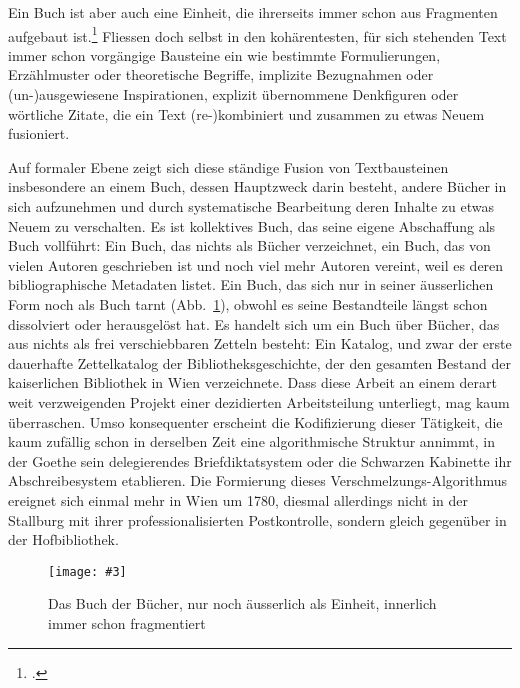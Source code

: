 \documentclass[a4paper,11pt]{article}
\newcommand{\pngbild}[4]{\texttt{[image: \#3]}}
\begin{document}
Ein Buch ist aber auch eine Einheit, die ihrerseits immer schon aus Fragmenten aufgebaut ist.\footcite[Zur Übersicht einer historischen Genese des Fragments als ästhetische Produktivkraft vgl.][]{fetscher:2001} Fliessen doch selbst in den kohärentesten, für sich stehenden Text immer schon vorgängige Bausteine ein wie bestimmte Formulierungen, Erzählmuster oder theoretische Begriffe, implizite Bezugnahmen oder (un-)ausgewiesene Inspirationen, explizit übernommene Denkfiguren oder wörtliche Zitate, die ein Text (re-)kombiniert und zusammen zu etwas Neuem fusioniert. 
 
Auf formaler Ebene zeigt sich diese ständige Fusion von Textbausteinen insbesondere an einem Buch, dessen Hauptzweck darin besteht, andere Bücher in sich aufzunehmen und durch systematische Bearbeitung deren Inhalte zu etwas Neuem zu verschalten. Es ist kollektives Buch, das seine eigene Abschaffung als Buch vollführt: Ein Buch, das nichts als Bücher verzeichnet, ein Buch, das von vielen Autoren geschrieben ist und noch viel mehr Autoren vereint, weil es deren bibliographische Metadaten listet. Ein Buch, das sich nur in seiner äusserlichen Form noch als Buch tarnt (Abb.~\ref{abb:kapsel}), obwohl es seine Bestandteile längst schon dissolviert oder herausgelöst hat. Es handelt sich um ein Buch über Bücher, das aus nichts als frei verschiebbaren Zetteln besteht: Ein Katalog, und zwar der erste dauerhafte Zettelkatalog der Bibliotheksgeschichte, der den gesamten Bestand der kaiserlichen Bibliothek in Wien verzeichnete. Dass diese Arbeit an einem derart weit verzweigenden Projekt einer dezidierten Arbeitsteilung unterliegt, mag kaum überraschen. Umso konsequenter erscheint die Kodifizierung dieser Tätigkeit, die kaum zufällig schon in derselben Zeit eine algorithmische Struktur annimmt, in der Goethe sein delegierendes Briefdiktatsystem oder die Schwarzen Kabinette ihr Abschreibesystem etablieren. Die Formierung dieses Verschmelzungs-Algorithmus ereignet sich einmal mehr in Wien um 1780, diesmal allerdings nicht in der Stallburg mit ihrer professionalisierten Postkontrolle, sondern gleich gegenüber in der Hofbibliothek.

\begin{figure}[ht]
\begin{center}
\pngbild{1335}{982}{../bilder/Kapsel.png}{0.8\textwidth}\\[-3mm]
\caption{Das Buch der Bücher, nur noch äusserlich als Einheit, innerlich immer schon fragmentiert}\label{abb:kapsel}
\end{center}
\end{figure}
\end{document}
